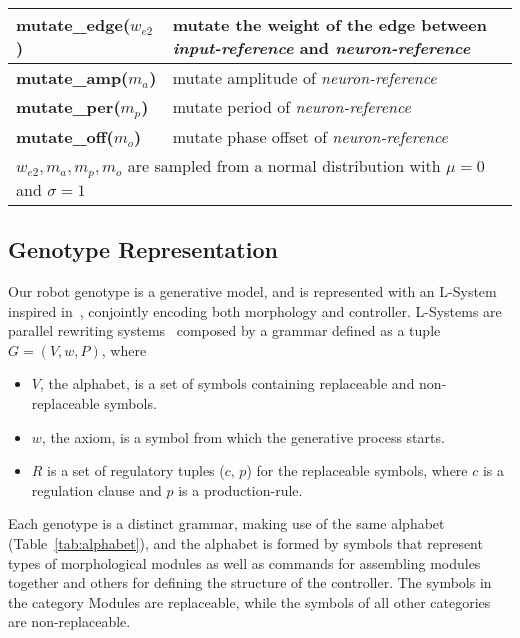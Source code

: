 \documentclass[utf8]{frontiersSCNS} %
\begin{document}
\begin{table}[t]
\begin{tabular}{|l|l|}
\textbf{mutate\_edge($w_{e2}$)}   &  mutate the weight of the edge between \textit{input-reference}  and \textit{neuron-reference} \\ \hline
\textbf{mutate\_amp($m_a$)}   &  mutate amplitude of \textit{neuron-reference} \\ \hline
\textbf{mutate\_per($m_p$)}   &  mutate period of \textit{neuron-reference} \\\hline
\textbf{mutate\_off($m_o$)}   &  mutate phase offset of \textit{neuron-reference} \\ 
\hline
   \multicolumn{2}{l}{
    $w_{e2}, m_a, m_p, m_o$   are sampled from a normal distribution with $\mu=0$ and $\sigma=1$  } \\  \hline
 
\end{tabular}

\label{tab:alphabet}
\label{table1}
 
\end{table}

 
\subsection{Genotype Representation}
\label{sec:representation}
   
 
Our robot genotype is a generative model, and is represented with an L-System inspired in~\citep{hornby2001body}, conjointly encoding both morphology and controller. L-Systems are parallel rewriting systems~\citep{jacob1994genetic} composed by a grammar defined as a tuple $G = (V, w, P)$, where
 
\begin{itemize}
  \item $V$, the alphabet, is a set of symbols containing replaceable and non-replaceable symbols.
  \item $w$, the axiom, is a symbol from which the generative process starts.
  \item $R$ is a set of regulatory tuples ($c$, $p$) for the replaceable symbols, where $c$ is a regulation clause and $p$ is a production-rule. 
  
\end{itemize}
 
Each genotype is a distinct grammar, making use of the same alphabet (Table~\ref{tab:alphabet}), and the alphabet is formed by symbols that represent types of morphological modules as well as commands for assembling modules together and others for defining the structure of the controller. The symbols in the category Modules are replaceable, while the symbols of all other categories are non-replaceable.
\end{document}
